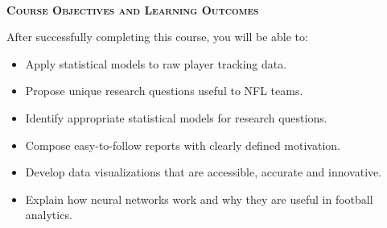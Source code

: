 \documentclass[11pt]{article}
\begin{document}
~\\
\textbf{\textsc{Course Objectives and Learning Outcomes}}
\begin{adjustwidth}{1cm}{0cm}
  After successfully completing this course, you will be able to:
  \begin{itemize}
    \item Apply statistical models to raw player tracking data.
    \item Propose unique research questions useful to NFL teams.
    \item Identify appropriate statistical models for research questions.
    \item Compose easy-to-follow reports with clearly defined motivation.
    \item Develop data visualizations that are accessible, accurate and innovative.
    \item Explain how neural networks work and why they are useful in football analytics.
  \end{itemize}
\end{adjustwidth}

\newpage
\end{document}
